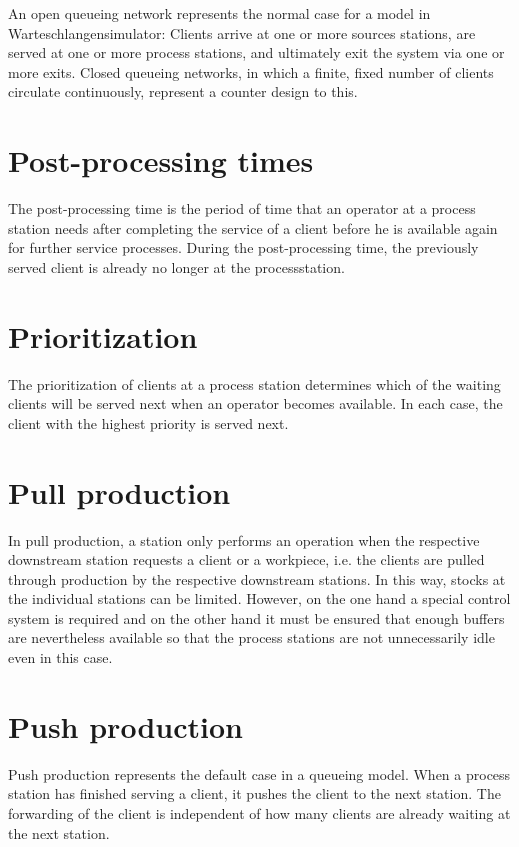 An open queueing network represents the normal case for a model in Warteschlangensimulator:
Clients arrive at one or more sources stations,
are served at one or more process stations,
and ultimately exit the system via one or more exits.
Closed queueing networks, in which a finite, fixed number of clients circulate continuously,
represent a counter design to this.

\section*{Post-processing times}


The post-processing time is the period of time that an operator at a process station
needs after completing the service of a client before he is available again for further service processes.
During the post-processing time, the previously served client is already no longer at the processstation.

\section*{Prioritization}


The prioritization of clients at a process station
determines which of the waiting clients will be served next when an operator becomes available.
In each case, the client with the highest priority is served next.

\section*{Pull production}


In pull production, a station only performs an operation when the respective downstream station
requests a client or a workpiece, i.e. the clients are pulled through production by the
respective downstream stations. In this way, stocks at the individual stations can be limited.
However, on the one hand a special control system is required and on the other hand it must be
ensured that enough buffers are nevertheless available so that the process stations are not
unnecessarily idle even in this case.

\section*{Push production}


Push production represents the default case in a queueing model. When a process station has
finished serving a client, it pushes the client to the next station. The forwarding of the
client is independent of how many clients are already waiting at the next station.

